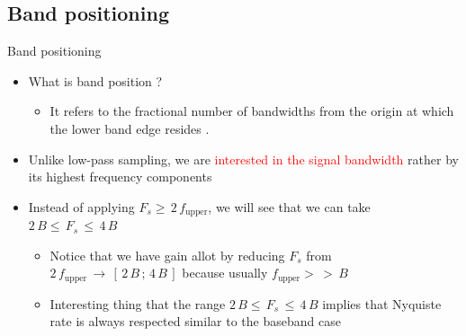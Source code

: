 \subsection{Band positioning}
\begin{frame}[t]{Band positioning}

\begin{itemize}

\item What is band position ?

	\begin{itemize}
	\item It refers to the fractional number of bandwidths from the origin at which the lower band edge resides \cite{paper_bandpass_sampling_theory}.
	\end{itemize}

\item Unlike low-pass sampling, we are \textcolor{red}{interested in the signal bandwidth} rather by its highest frequency components

\item Instead of applying $F_s \geq \, 2 \, f_{\text{upper}}$, we will see that we can take $ 2 \, B \leq \, F_s \, \leq \, 4 \, B$

	\begin{itemize}
	\item Notice that we have gain allot by reducing $F_s$ from $ 2 \, f_{\text{upper}} \, \rightarrow \, [\,2 \, B \, ; \, 4 \, B \, ]$ because usually $f_{\text{upper}} >\, >\, B$
	
	\item Interesting thing that the range $2 \, B \leq \, F_s \, \leq \, 4 \, B$ implies that Nyquiste rate is always respected similar to the baseband case
	\end{itemize}

\end{itemize}

\end{frame}

